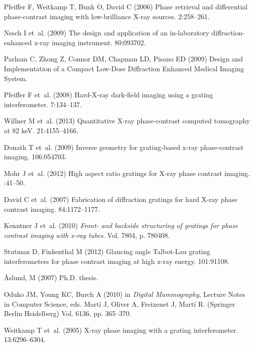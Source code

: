 \documentclass{pnastwo}
\begin{document}
\begin{article}
\begin{thebibliography}{10}
Pfeiffer F, Weitkamp T, Bunk O, David C (2006) {Phase retrieval and
  differential phase-contrast imaging with low-brilliance X-ray sources}.
 2:258--261.

Nesch I et~al. (2009) {The design and application of an in-laboratory
  diffraction-enhanced x-ray imaging instrument.}
 80:093702.

Parham C, Zhong Z, Connor DM, Chapman LD, Pisano ED (2009) {Design and
  Implementation of a Compact Low-Dose Diffraction Enhanced Medical Imaging
  System}.

Pfeiffer F et~al. (2008) {Hard-X-ray dark-field imaging using a grating
  interferometer}.
 7:134--137.

Willner M et~al. (2013) {Quantitative X-ray phase-contrast computed tomography
  at 82 keV}.
 21:4155--4166.

Donath T et~al. (2009) {Inverse geometry for grating-based x-ray phase-contrast
  imaging}.
 106:054703.

Mohr J et~al. (2012) {High aspect ratio gratings for X-ray phase contrast
  imaging}.
:41--50.

David C et~al. (2007) {Fabrication of diffraction gratings for hard X-ray phase
  contrast imaging}.
 84:1172--1177.

Kenntner J et~al. (2010) {\em {Front- and backside structuring of gratings for
  phase contrast imaging with x-ray tubes}}.
\newblock Vol.{} 7804, p. 780408.

Stutman D, Finkenthal M (2012) {Glancing angle Talbot-Lau grating
  interferometers for phase contrast imaging at high x-ray energy}.
 101:91108.

{\AA slund, M} (2007) Ph.D. thesis.

Oduko JM, Young KC, Burch A (2010) in {\em Digital Mammography}, Lecture Notes
  in Computer Science, eds.{} Martí J, Oliver A, Freixenet J, Martí R.
\newblock (Springer Berlin Heidelberg) Vol.{} 6136, pp. 365--370.

Weitkamp T et~al. (2005) {X-ray phase imaging with a grating interferometer}.
 13:6296--6304.


\end{thebibliography}
\end{article}
\end{document}
